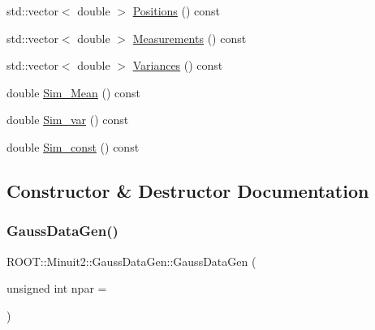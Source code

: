 \begin{DoxyCompactItemize}
std\+::vector$<$ double $>$ \mbox{\hyperlink{classROOT_1_1Minuit2_1_1GaussDataGen_a1f8db2c19b438ac1665045a5737c1d62}{Positions}} () const
\item 
std\+::vector$<$ double $>$ \mbox{\hyperlink{classROOT_1_1Minuit2_1_1GaussDataGen_aa943fffb99444ab2b72198f36b906f71}{Measurements}} () const
\item 
std\+::vector$<$ double $>$ \mbox{\hyperlink{classROOT_1_1Minuit2_1_1GaussDataGen_ab2f22917ba4f242a2888c908a8629260}{Variances}} () const
\item 
double \mbox{\hyperlink{classROOT_1_1Minuit2_1_1GaussDataGen_a97c0d9f3e7d706d93a06f8bad82e137a}{Sim\+\_\+\+Mean}} () const
\item 
double \mbox{\hyperlink{classROOT_1_1Minuit2_1_1GaussDataGen_ab46d49eb0cd02fcf7e5799258133c91b}{Sim\+\_\+var}} () const
\item 
double \mbox{\hyperlink{classROOT_1_1Minuit2_1_1GaussDataGen_afa45bb0270f15866b588da8d8f56cfba}{Sim\+\_\+const}} () const
\end{DoxyCompactItemize}


\subsection{Constructor \& Destructor Documentation}
\mbox{\label{classROOT_1_1Minuit2_1_1GaussDataGen_a9d4852a18f8d4f261ea60f5b2abeee4d}} 
\subsubsection{\texorpdfstring{GaussDataGen()}{GaussDataGen()}\hspace{0.1cm}{\footnotesize\ttfamily [1/2]}}
{\footnotesize\ttfamily R\+O\+O\+T\+::\+Minuit2\+::\+Gauss\+Data\+Gen\+::\+Gauss\+Data\+Gen (\begin{DoxyParamCaption}\item[{unsigned int}]{npar = {} }\end{DoxyParamCaption})}

